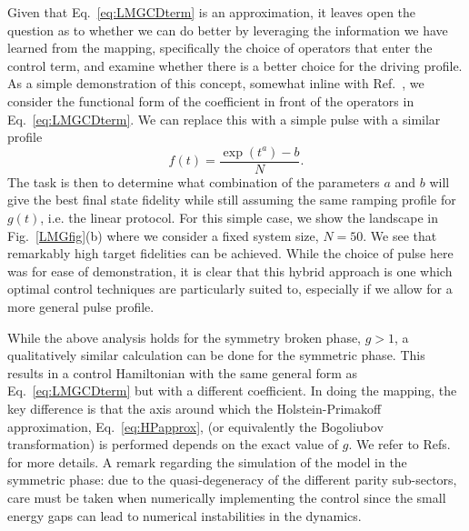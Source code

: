 Given that Eq.~\eqref{eq:LMGCDterm} is an approximation, it leaves open the question as to whether we can do better by leveraging the information we have learned from the mapping, specifically the choice of operators that enter the control term, and examine whether there is a better choice for the driving profile. 
As a simple demonstration of this concept, somewhat inline with Ref.~\cite{CampbellPRL}, we consider the functional form of the coefficient in front of the operators in Eq.~\eqref{eq:LMGCDterm}. We can replace this with a simple pulse with a similar profile
\begin{equation}
\label{eq:GuessPulseLMG}
f(t) = \frac{\exp(t^a)-b}{N}.
\end{equation}
The task is then to determine what combination of the parameters $a$ and $b$ will give the best final state fidelity while still assuming the same ramping profile for $g(t)$, i.e. the linear protocol. For this simple case, we show the landscape in Fig.~\ref{LMGfig}(b) where we consider a fixed system size, $N=50$. We see that remarkably high target fidelities can be achieved. While the choice of pulse here was for ease of demonstration, it is clear that this hybrid approach is one which optimal control techniques are particularly suited to, especially if we allow for a more general pulse profile. 

While the above analysis holds for the symmetry broken phase, $g>1$, a qualitatively similar calculation can be done for the symmetric phase. This results in a control Hamiltonian with the same general form as Eq.~\eqref{eq:LMGCDterm} but with a different coefficient. In doing the mapping, the key difference is that the axis around which the Holstein-Primakoff approximation, Eq.~\eqref{eq:HPapprox}, (or equivalently the Bogoliubov transformation) is performed depends on the exact value of $g$. We refer to Refs.~\cite{TakahashiPRE, CampbellPRL, LMG1, LMG2} for more details. A remark regarding the simulation of the model in the symmetric phase: due to the quasi-degeneracy of the different parity sub-sectors, care must be taken when numerically implementing the control since the small energy gaps can lead to numerical instabilities in the dynamics. 

